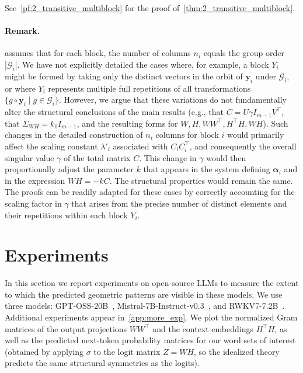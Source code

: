 \documentclass[11pt]{article}
\begin{document}
See~\cref{pf:2_transitive_multiblock} for the proof of~\cref{thm:2_transitive_multiblock}.

\paragraph{Remark.}
 assumes that for each block, the number of columns \( n_i \) equals the group order \( |\mathcal G_i| \). 
We have not explicitly detailed the cases where, for example, a block \(Y_i\) might be formed by taking only the distinct vectors in the orbit of \(\boldsymbol{y}_i\) under \(\mathcal G_i\), or where \(Y_i\) represents multiple full repetitions of all transformations \(\{g\circ \boldsymbol{y}_i \mid g \in \mathcal G_i\}\).
However, we argue that these variations do not fundamentally alter the structural conclusions of the main results (e.g., that \(C=U\gamma I_{m-1}V^\top\), that \(\Sigma_{WH}=k_0 I_{m-1}\), and the resulting forms for \(W, H, WW^\top, H^\top H, WH\)). Such changes in the detailed construction of \(n_i\) columns for block \(i\) would primarily affect the scaling constant \(\lambda'_i\) associated with \(C_iC_i^\top\), and consequently the overall singular value \(\gamma\) of the total matrix \(C\). This change in \(\gamma\) would then proportionally adjust the parameter \(k\) that appears in the system defining \(\boldsymbol{\alpha}_i\) and in the expression \(WH = -kC\). The structural properties would remain the same. The proofs can be readily adapted for these cases by correctly accounting for the scaling factor in \(\gamma\) that arises from the precise number of distinct elements and their repetitions within each block \(Y_i\).

\section{Experiments}
\label{sec:exp}

In this section we report experiments on open-source LLMs to measure the extent to which the predicted geometric patterns are visible in these models. We use three models: GPT-OSS-20B~\citep{openai2025gptoss120bgptoss20bmodel}, Mistral-7B-Instruct-v0.3~\citep{jiang2023mistral7b}, and RWKV7-7.2B~\citep{peng2025rwkv}. Additional experiments appear in~\cref{app:more_exp}. We plot the normalized Gram matrices of the output projections \(WW^\top\) and the context embeddings \(H^\top H\), as well as the predicted next-token probability matrices for our word sets of interest (obtained by applying \(\sigma\) to the logit matrix \(Z=WH\), so the idealized theory predicts the same structural symmetries as the logits). 
\end{document}
